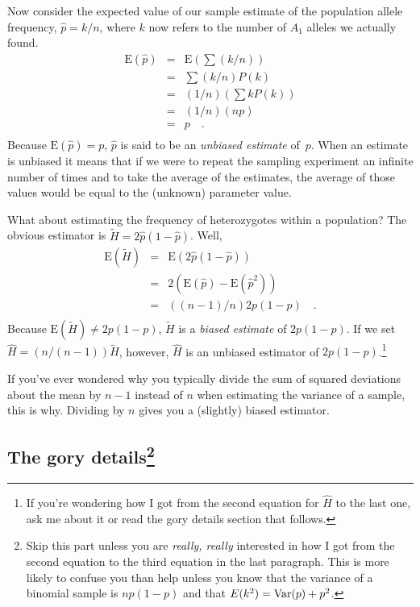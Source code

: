 Now consider the expected value of our sample estimate of the
population allele frequency, $\hat p = k/n$, where $k$ now refers to
the number of $A_1$ alleles we actually found.
\begin{eqnarray*}
\mbox{E}(\hat p) &=& \mbox{E}\left(\sum (k/n)\right) \\
          &=& \sum (k/n) P(k) \\
          &=& (1/n)\left(\sum k P(k)\right) \\
          &=& (1/n)(n p) \\
          &=& p \quad . \\
\end{eqnarray*}
Because $\mbox{E}(\hat p) = p$, $\hat p$ is said to be an {\it
  unbiased estimate} of~$p$. When an estimate
is unbiased it means that if we were to repeat the sampling experiment
an infinite number of times and to take the average of the estimates,
the average of those values would be equal to the (unknown) parameter
value.

What about estimating the frequency of heterozygotes within a
population? The obvious estimator is $\tilde H = 2\hat p (1 - \hat
p)$. Well,
\begin{eqnarray*}
\mbox{E}(\tilde H) &=& \mbox{E}\left(2\hat p (1 - \hat p)\right) \\
     &=& 2\left(\mbox{E}(\hat p) - \mbox{E}({\hat p}^2)\right) \\
     &=& ((n-1)/n)2p(1-p) \quad . \\
\end{eqnarray*}
Because $\mbox{E}(\tilde H) \ne 2p(1-p)$, $\tilde H$ is a {\it biased
estimate\/} of $2p(1-p)$. If we set $\hat H = (n/(n-1))\tilde H$,
however, $\hat H$ is an unbiased estimator of $2p(1-p)$.\footnote{If
  you're wondering how I got from the second equation for $\hat H$ to
  the last one, ask me about it or read the gory details section that
  follows.}

If you've ever wondered why you typically divide the sum of squared
deviations about the mean by $n-1$ instead of $n$ when estimating the
variance of a sample, this is why. Dividing by $n$ gives you a
(slightly) biased estimator.

\subsection*{The gory details\footnote{Skip this part unless
  you are {\it really, really\/} interested in how I got from the
second equation to the third equation in the last paragraph. This is
more likely to confuse you than help unless you know that the variance
of a binomial sample is $np(1-p)$ and that $E(k^2) = \hbox{Var}(p) +
p^2$.}}

